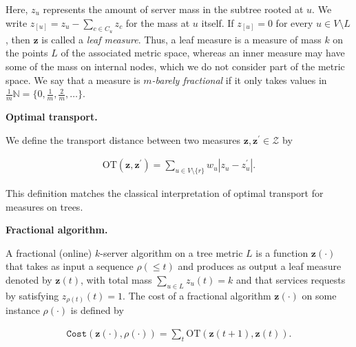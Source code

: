 \documentclass[10pt,a4paper]{article}
\begin{document}
Here, $z_{u}$ represents the amount of server mass in the subtree rooted at $u$. We write $z_{[u]}=z_{u}-\sum_{c\in C_{u}}z_{c}$ for the mass at $u$ itself. If $z_{[u]}=0$ for every $u\in V\setminus L$, then ${\mathbf{z}}$ is called a \emph{leaf measure}. Thus, a leaf measure is a measure of mass $k$ on the points $L$ of the associated metric space, whereas an inner measure may have some of the mass on internal nodes, which we do not consider part of the metric space. We say that a measure is \emph{$m$-barely fractional} if it only takes values in $\frac{1}{m}\mathbb{N}=\{0,\frac{1}{m},\frac{2}{m},\dots\}$.\par





\par\medskip\noindent\textbf{Optimal transport.}\par




We define the transport distance between two measures ${\mathbf{z}},{\mathbf{z}}^{\prime}\in\mathcal{Z}$ by\par


\[\begin{gathered}
\text{OT}({\mathbf{z}},{\mathbf{z}}^{\prime})=\sum_{u\in V\setminus\{r\}}w_{u}|z_{u}-z_{u}^{\prime}|.
\end{gathered}\]


This definition matches the classical interpretation of optimal transport for measures on trees.\par





\par\medskip\noindent\textbf{Fractional algorithm.}\par




A fractional (online) $k$-server algorithm on a tree metric $L$ is a function ${\mathbf{z}}(\cdot)$ that takes as input a sequence $\rho(\leq t)$ and produces as output a leaf measure denoted by ${\mathbf{z}}(t)$, with total mass $\sum_{u\in L}z_{u}(t)=k$ and that services requests by satisfying $z_{\rho(t)}(t)=1$. The cost of a fractional algorithm ${\mathbf{z}}(\cdot)$ on some instance $\rho(\cdot)$ is defined by\par


\[\begin{gathered}
{\texttt{Cost}}({\mathbf{z}}(\cdot),\rho(\cdot))=\sum_{t}\text{OT}({\mathbf{z}}(t+1),{\mathbf{z}}(t)).
\end{gathered}\]
\end{document}
